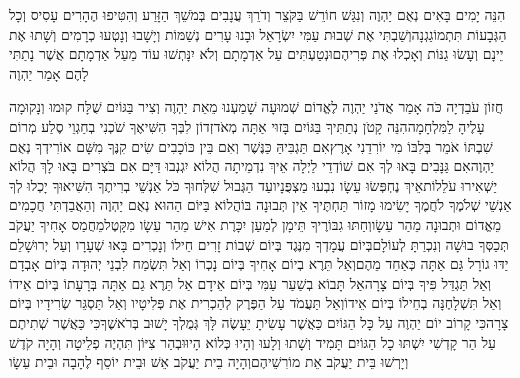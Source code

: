 \documentclass[../main/main.tex]{subfiles}
\begin{document}
\begin{multicols*}{\ncols}
הִנֵּה יָמִים בָּאִים נְאֻם יַהְוֶה וְנִגַּשׁ חוֹרֵשׁ בַּקֹּצֵר וְדֹרֵךְ עֲנָבִים בְּמֹשֵׁךְ הַזָּרַע וְהִטִּיפוּ הֶהָרִים עָסִיס וְכָל הַגְּבָעוֹת תִּתְמוֹגַגְנָה\PreVerseSpace{}וְשַׁבְתִּי אֶת שְׁבוּת עַמִּי יִשְׂרָאֵל וּבָנוּ עָרִים נְשַׁמּוֹת וְיָשָׁבוּ וְנָטְעוּ כְרָמִים וְשָׁתוּ אֶת יֵינָם וְעָשׂוּ גַנּוֹת וְאָכְלוּ אֶת פְּרִיהֶם\PreVerseSpace{}וּנְטַעְתִּים עַל אַדְמָתָם וְלֹא יִנָּתְשׁוּ עוֹד מֵעַל אַדְמָתָם אֲשֶׁר נָתַתִּי לָהֶם אָמַר יַהְוֶה\par
\end{multicols*}
\pagebreak
{}
\begin{multicols*}{\ncols}
חֲזוֹן עֹבַדְיָה כֹּה אָמַר אֲדֹנַי יַהְוֶה לֶאֱדוֹם שְׁמוּעָה שָׁמַעְנוּ מֵאֵת יַהְוֶה וְצִיר בַּגּוֹיִם שֻׁלָּח קוּמוּ וְנָקוּמָה עָלֶיהָ לַמִּלְחָמָה\PreVerseSpace{}הִנֵּה קָטֹן נְתַתִּיךָ בַּגּוֹיִם בָּזוּי אַתָּה מְאֹד\PreVerseSpace{}זְדוֹן לִבְּךָ הִשִּׁיאֶךָ שֹׁכְנִי בְחַגְוֵי סֶלַע מְרוֹם שִׁבְתּוֹ אֹמֵר בְּלִבּוֹ מִי יוֹרִדֵנִי אָרֶץ\PreVerseSpace{}אִם תַּגְבִּיהַּ כַּנֶּשֶׁר וְאִם בֵּין כּוֹכָבִים שִׂים קִנֶּךָ מִשָּׁם אוֹרִידְךָ נְאֻם יַהְוֶה\PreVerseSpace{}אִם גַּנָּבִים בָּאוּ לְךָ אִם שׁוֹדְדֵי לַיְלָה אֵיךְ נִדְמֵיתָה הֲלוֹא יִגְנְבוּ דַּיָּם אִם בֹּצְרִים בָּאוּ לָךְ הֲלוֹא יַשְׁאִירוּ עֹלֵלוֹת\PreVerseSpace{}אֵיךְ נֶחְפְּשׂוּ עֵשָׂו נִבְעוּ מַצְפֻּנָיו\PreVerseSpace{}עַד הַגְּבוּל שִׁלְּחוּךָ כֹּל אַנְשֵׁי בְרִיתֶךָ הִשִּׁיאוּךָ יָכְלוּ לְךָ אַנְשֵׁי שְׁלֹמֶךָ לֹחֲמֶךָ\SubEnd{} יָשִׂימוּ מָזוֹר תַּחְתֶּיךָ אֵין תְּבוּנָה בּוֹ\PreVerseSpace{}הֲלוֹא בַּיּוֹם הַהוּא נְאֻם יַהְוֶה וְהַאֲבַדְתִּי חֲכָמִים מֵאֱדוֹם וּתְבוּנָה מֵהַר עֵשָׂו\PreVerseSpace{}וְחַתּוּ גִבּוֹרֶיךָ תֵּימָן לְמַעַן יִכָּרֶת אִישׁ מֵהַר עֵשָׂו מִקָּטֶל\PreVerseSpace{}מֵחֲמַס אָחִיךָ יַעֲקֹב תְּכַסְּךָ בוּשָׁה וְנִכְרַתָּ לְעוֹלָם\PreVerseSpace{}בְּיוֹם עֲמָדְךָ מִנֶּגֶד בְּיוֹם שְׁבוֹת זָרִים חֵילוֹ וְנָכְרִים בָּאוּ שְׁעָרָו וְעַל יְרוּשָׁלֵם יַדּוּ גוֹרָל גַּם אַתָּה כְּאַחַד מֵהֶם\PreVerseSpace{}וְאַל תֵּרֶא בְיוֹם אָחִיךָ בְּיוֹם נָכְרוֹ וְאַל תִּשְׂמַח לִבְנֵי יְהוּדָה בְּיוֹם אָבְדָם וְאַל תַּגְדֵּל פִּיךָ בְּיוֹם צָרָה\PreVerseSpace{}אַל תָּבוֹא בְשַׁעַר עַמִּי בְּיוֹם אֵידָם אַל תֵּרֶא גַם אַתָּה בְּרָעָתוֹ בְּיוֹם אֵידוֹ וְאַל תִּשְׁלָחֶנָּה\SubEnd{} בְחֵילוֹ בְּיוֹם אֵידוֹ\PreVerseSpace{}וְאַל תַּעֲמֹד עַל הַפֶּרֶק לְהַכְרִית אֶת פְּלִיטָיו וְאַל תַּסְגֵּר שְׂרִידָיו בְּיוֹם צָרָה\PreVerseSpace{}כִּי קָרוֹב יוֹם יַהְוֶה עַל כָּל הַגּוֹיִם כַּאֲשֶׁר עָשִׂיתָ יֵעָשֶׂה לָּךְ גְּמֻלְךָ יָשׁוּב בְּרֹאשֶׁךָ\PreVerseSpace{}כִּי כַּאֲשֶׁר שְׁתִיתֶם עַל הַר קָדְשִׁי יִשְׁתּוּ כָל הַגּוֹיִם תָּמִיד וְשָׁתוּ וְלָעוּ וְהָיוּ כְּלוֹא הָיוּ\PreVerseSpace{}וּבְהַר צִיּוֹן תִּהְיֶה פְלֵיטָה וְהָיָה קֹדֶשׁ וְיָרְשׁוּ בֵּית יַעֲקֹב אֵת מוֹרִשֵׁיהֶם\SubEnd{}\PreVerseSpace{}וְהָיָה בֵית יַעֲקֹב אֵשׁ וּבֵית יוֹסֵף לֶהָבָה וּבֵית עֵשָׂו 
\end{multicols*}
\end{document}
